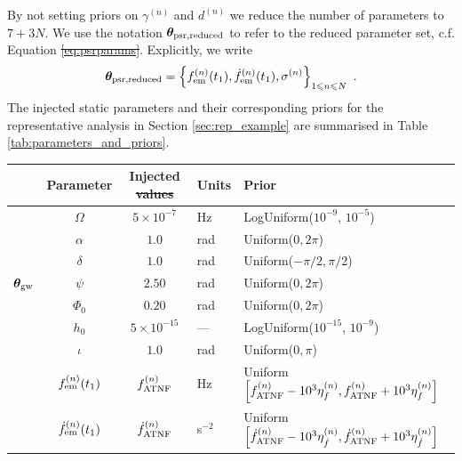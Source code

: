 \documentclass[fleqn,usenatbib,useAMS]{mnras}
\providecommand{\DIFadd}[1]{{\protect\color{blue}\uwave{#1}}} %
\providecommand{\DIFdel}[1]{{\protect\color{red}\sout{#1}}}                      %
\providecommand{\DIFaddbegin}{} %
\providecommand{\DIFaddend}{} %
\providecommand{\DIFdelbegin}{} %
\providecommand{\DIFdelend}{} %
\providecommand{\DIFaddFL}[1]{\DIFadd{#1}} %
\providecommand{\DIFdelFL}[1]{\DIFdel{#1}} %
\providecommand{\DIFaddbeginFL}{} %
\providecommand{\DIFaddendFL}{} %
\providecommand{\DIFdelbeginFL}{} %
\providecommand{\DIFdelendFL}{} %
\newcommand{\DIFscaledelfig}{0.5}
\newlength{\DIFdelgraphicswidth} %
\newlength{\DIFdelgraphicsheight} %
\newcommand{\DIFaddincludegraphics}[2][]{{\color{blue}\fbox{\DIFOincludegraphics[#1]{#2}}}} %
\newcommand{\DIFdelincludegraphics}[2][]{%
\sbox{\DIFdelgraphicsbox}{\DIFOincludegraphics[#1]{#2}}%
\settoboxwidth{\DIFdelgraphicswidth}{\DIFdelgraphicsbox} %
\settoboxtotalheight{\DIFdelgraphicsheight}{\DIFdelgraphicsbox} %
\scalebox{\DIFscaledelfig}{%
\parbox[b]{\DIFdelgraphicswidth}{\usebox{\DIFdelgraphicsbox}\\[-\baselineskip] \rule{\DIFdelgraphicswidth}{0em}}\llap{\resizebox{\DIFdelgraphicswidth}{\DIFdelgraphicsheight}{%
\setlength{\unitlength}{\DIFdelgraphicswidth}%
\begin{picture}(1,1)%
\thicklines\linethickness{2pt} %
{\color[rgb]{1,0,0}\put(0,0){\framebox(1,1){}}}%
{\color[rgb]{1,0,0}\put(0,0){\line( 1,1){1}}}%
{\color[rgb]{1,0,0}\put(0,1){\line(1,-1){1}}}%
\end{picture}%
}\hspace*{3pt}}} %
} %
\DeclareRobustCommand{\DIFaddbegin}{\DIFOaddbegin \let\includegraphics\DIFaddincludegraphics} %
\DeclareRobustCommand{\DIFaddend}{\DIFOaddend \let\includegraphics\DIFOincludegraphics} %
\DeclareRobustCommand{\DIFdelbegin}{\DIFOdelbegin \let\includegraphics\DIFdelincludegraphics} %
\DeclareRobustCommand{\DIFdelend}{\DIFOaddend \let\includegraphics\DIFOincludegraphics} %
\DeclareRobustCommand{\DIFaddbeginFL}{\DIFOaddbeginFL \let\includegraphics\DIFaddincludegraphics} %
\DeclareRobustCommand{\DIFaddendFL}{\DIFOaddendFL \let\includegraphics\DIFOincludegraphics} %
\DeclareRobustCommand{\DIFdelbeginFL}{\DIFOdelbeginFL \let\includegraphics\DIFdelincludegraphics} %
\DeclareRobustCommand{\DIFdelendFL}{\DIFOaddendFL \let\includegraphics\DIFOincludegraphics} %
\begin{document}
By not setting priors on $\gamma^{(n)}$ and $d^{(n)}$ we reduce the number of parameters to $7 + 3N$. We use the notation $\boldsymbol{\theta}_{\rm psr, reduced}$ to refer to the reduced parameter set, c.f. Equation \DIFdelbegin \DIFdel{\ref{eq:psrparams}}\DIFdelend \DIFaddbegin \DIFadd{\eqref{eq:psrparams}}\DIFaddend . Explicitly, we write
\begin{equation}
	\boldsymbol{\theta}_{\rm psr, reduced} = \left \{ f_{\rm em}^{(n)}(t_1),\dot{f}_{\rm em}^{(n)}(t_1),\sigma^{(n)}\right\}_{1\leq n \leq N} \ . \label{eq:psrreduced}
\end{equation}
The injected static parameters and their corresponding priors for the representative analysis in Section \ref{sec:rep_example} are summarised in Table \ref{tab:parameters_and_priors}.
\begin{table}
	\centering
	\begin{tabular}{lccll}
		\toprule
		&Parameter & Injected \DIFdelbeginFL \DIFdelFL{values }\DIFdelendFL \DIFaddbeginFL \DIFaddFL{value }\DIFaddendFL & Units & Prior  \\
		\hline
		\multirow{7}{2mm}{$\boldsymbol{\theta}_{\rm gw}$} & $\Omega$       & $5 \times 10^{-7}$ & Hz & LogUniform($10^{-9}$, $10^{-5}$) \\
	  & $\alpha$          & $1.0$  & rad & Uniform($0, 2 \pi $)\\
	  & $\delta$              & $1.0$  & rad & Uniform($-\pi/2, \pi/2$) \\
	  & $\psi$              & $2.50$ & rad & Uniform($0, 2 \pi $) \\
	  & $\Phi_0$          & $0.20$ & rad & Uniform($0, 2 \pi $) \\
	  & $h_0$            & $5 \times 10^{-15}$ & --- & LogUniform($10^{-15}$, $10^{-9}$) \\
	  & $\iota$             & $1.0$ & rad & Uniform($0, \pi$) \\ 
		\hline
		\vspace{1mm}\multirow{5}{2mm}{$\boldsymbol{\theta}_{\rm psr}$} & $f_{\rm em}^{(n)} (t_1)$       & $f_{\rm ATNF}^{(n)}$ & Hz & Uniform$\left[f_{\rm ATNF}^{(n)} - 10^3 \eta^{(n)}_{f}, f_{\rm ATNF}^{(n)} + 10^3 \eta^{(n)}_{f} \right]$ \\
		& $\dot{f}_{\rm em}^{(n)} (t_1)$       & $\dot{f}_{\rm ATNF}^{(n)}$ & s$^{-2}$ & Uniform$\left[ \dot{f}_{\rm ATNF}^{(n)} - 10^3 \eta^{(n)}_{\dot{f}}, \dot{f}_{\rm ATNF}^{(n)} + 10^3 \eta^{(n)}_{\dot{f}} \right]$ \\

\end{tabular}
\end{table}
\end{document}
